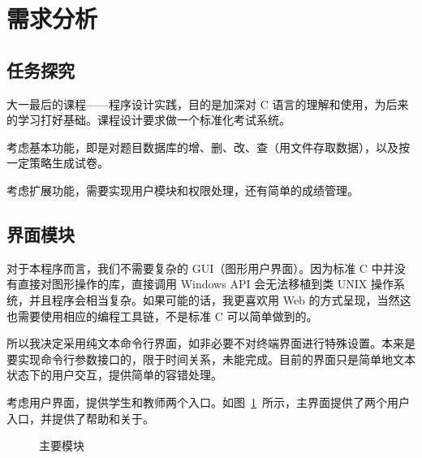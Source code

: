 \section{需求分析}

\subsection{任务探究}

大一最后的课程——程序设计实践，目的是加深对 C 语言的理解和使用，为后来的学习打好基础。课程设计要求做一个标准化考试系统。


考虑基本功能，即是对题目数据库的增、删、改、查（用文件存取数据），以及按一定策略生成试卷。

考虑扩展功能，需要实现用户模块和权限处理，还有简单的成绩管理。

\subsection{界面模块}

对于本程序而言，我们不需要复杂的 GUI（图形用户界面）。因为标准 C 中并没有直接对图形操作的库，直接调用 Windows API 会无法移植到类 UNIX 操作系统，并且程序会相当复杂。如果可能的话，我更喜欢用 Web 的方式呈现，当然这也需要使用相应的编程工具链，不是标准 C 可以简单做到的。

所以我决定采用纯文本命令行界面，如非必要不对终端界面进行特殊设置。本来是要实现命令行参数接口的，限于时间关系，未能完成。目前的界面只是简单地文本状态下的用户交互，提供简单的容错处理。

考虑用户界面，提供学生和教师两个入口。如图~\ref{al_main}~所示，主界面提供了两个用户入口，并提供了帮助和关于。

\begin{figure}[htp]
\pictext
\caption{\label{al_main}主要模块}  
\end{figure}

